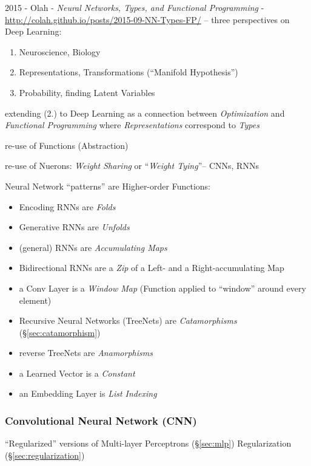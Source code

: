 \asterism

2015 - Olah - \emph{Neural Networks, Types, and Functional Programming}
- \url{http://colah.github.io/posts/2015-09-NN-Types-FP/} --
three perspectives on Deep Learning:
\begin{enumerate}
  \item Neuroscience, Biology
  \item Representations, Transformations (``Manifold Hypothesis'')
  \item Probability, finding Latent Variables
\end{enumerate}
extending (2.) to Deep Learning as a connection between \emph{Optimization} and
\emph{Functional Programming} where \emph{Representations} correspond to
\emph{Types}

re-use of Functions (Abstraction)

re-use of Nuerons: \emph{Weight Sharing} or ``\emph{Weight Tying}''-- CNNs, RNNs

Neural Network ``patterns'' are Higher-order Functions:
\begin{itemize}
  \item Encoding RNNs are \emph{Folds}
  \item Generative RNNs are \emph{Unfolds}
  \item (general) RNNs are \emph{Accumulating Maps}
  \item Bidirectional RNNs are a \emph{Zip} of a Left- and a Right-accumulating
    Map
  \item a Conv Layer is a \emph{Window Map} (Function applied to ``window''
    around every element)
  \item Recursive Neural Networks (TreeNets) are \emph{Catamorphisms}
    (\S\ref{sec:catamorphism})
  \item reverse TreeNets are \emph{Anamorphisms}
  \item a Learned Vector is a \emph{Constant}
  \item an Embedding Layer is \emph{List Indexing}
\end{itemize}



\subsubsection{Convolutional Neural Network (CNN)}\label{sec:cnn}

``Regularized'' versions of Multi-layer Perceptrons (\S\ref{sec:mlp})
\fist Regularization (\S\ref{sec:regularization})

